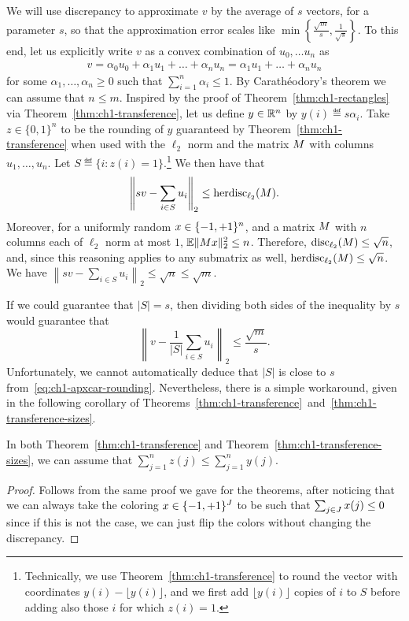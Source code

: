 We will use discrepancy to approximate $v$ by the average of $s$ vectors, for a parameter $s$, so that the approximation error scales like $\min\left\{\frac{\sqrt{m}}{s}, \frac{1}{\sqrt{s}}\right\}$.
To this end, let us explicitly write $v$ as a convex combination of $u_0, \ldots u_n$ as
\begin{align*}
    v = \alpha_0 u_0 + \alpha_1 u_1 + \ldots + \alpha_n u_n
    = \alpha_1 u_1 + \ldots + \alpha_n u_n
\end{align*}
for some $\alpha_1, \ldots, \alpha_n \ge 0$ such that $\sum_{i=1}^n \alpha_i \le 1$. By Carath\'eodory's theorem we can assume that $n \le m$. Inspired by the proof of Theorem~\ref{thm:ch1-rectangles} via Theorem~\ref{thm:ch1-transference}, let us define $y \in \mathbb{R}^n$ by $y(i) \eqdef s \alpha_i$. Take $z \in \{0,1\}^n$ to be the rounding of $y$ guaranteed by Theorem~\ref{thm:ch1-transference} when used with the $\ell_2$ norm and the matrix $M$ with columns $u_1, \ldots, u_n$. Let $S \eqdef \{i: z(i) = 1\}$.\footnote{Technically, we use Theorem~\ref{thm:ch1-transference} to round the vector with coordinates $y(i) - \lfloor y(i)\rfloor$, and we first add $\lfloor y(i) \rfloor$ copies of $i$ to $S$ before adding also those $i$ for which $z(i) = 1$.} We then have that
\begin{equation}\label{eq:ch1-apxcar-rounding}
   \left\|sv - \sum_{i\in S} u_i\right\|_2 \le \operatorname{herdisc}_{\ell_2}(M). 
\end{equation}
Moreover,  for a uniformly random $x \in \{-1,+1\}^n$, and a matrix $M$ with $n$ columns each of $\ell_2$ norm at most $1$, $\mathbb{E} \|Mx\|_2^2 \le n$. Therefore, $\operatorname{disc}_{\ell_2}(M) \le \sqrt{n}$, and, since this reasoning applies to any submatrix as well, $\operatorname{herdisc}_{\ell_2}(M) \le \sqrt{n}$. We have 
$
\left\|sv - \sum_{i\in S} u_i\right\|_2 \le \sqrt{n}\le \sqrt{m}.$

If we could guarantee that $|S| = s$, then dividing both sides of the inequality by $s$ would guarantee that 
\[
\left\|v - \frac{1}{|S|}\sum_{i\in S} u_i\right\|_2 \le \frac{\sqrt{m}}{s}.
\]
Unfortunately, we cannot automatically deduce that $|S|$ is close to $s$ from~\eqref{eq:ch1-apxcar-rounding}. Nevertheless, there is a simple workaround, given in the following corollary of Theorems~\ref{thm:ch1-transference}~and~\ref{thm:ch1-transference-sizes}.
\begin{corollary}\label{cor:ch1-transference}
    In both Theorem~\ref{thm:ch1-transference} and Theorem~\ref{thm:ch1-transference-sizes}, we can assume that $\sum_{j=1}^n z(j) \le \sum_{j=1}^n y(j)$.
\end{corollary}
\begin{proof}
    Follows from the same proof we gave for the theorems, after noticing that we can always take the coloring $x \in \{-1,+1\}^J$ to be such that $\sum_{j \in J}x(j) \le 0$ since if this is not the case, we can just flip the colors without changing the discrepancy.
\end{proof}

